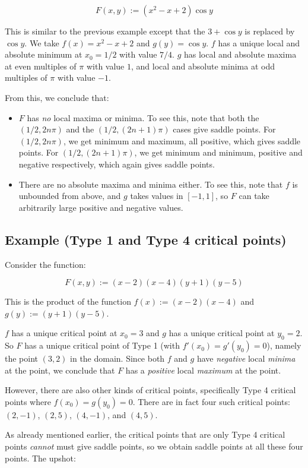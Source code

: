 \documentclass[10pt]{amsart}
\begin{document}
$$F(x,y) := (x^2 - x + 2)\cos y$$

This is similar to the previous example except that the $3 + \cos y$
is replaced by $\cos y$. We take $f(x) = x^2 - x + 2$ and $g(y) = \cos
y$. $f$ has a unique local and absolute minimum at $x_0 = 1/2$ with
value $7/4$. $g$ has local and absolute maxima at even multiples of
$\pi$ with value $1$, and local and absolute minima at odd multiples
of $\pi$ with value $-1$.

From this, we conclude that:

\begin{itemize}
\item $F$ has {\em no} local maxima or minima. To see this, note that
  both the $(1/2,2n\pi)$ and the $(1/2,(2n + 1)\pi)$ cases give saddle
  points. For $(1/2,2n\pi)$, we get minimum and maximum, all positive,
  which gives saddle points. For $(1/2,(2n+1)\pi)$, we get minimum and
  minimum, positive and negative respectively, which again gives
  saddle points.
\item There are no absolute maxima and minima either. To see this,
  note that $f$ is unbounded from above, and $g$ takes values in
  $[-1,1]$, so $F$ can take arbitrarily large positive and negative
  values.
\end{itemize}

\subsection{Example (Type 1 and Type 4 critical points)}

Consider the function:

$$F(x,y) := (x-2)(x-4)(y+1)(y - 5)$$

This is the product of the function $f(x) := (x-2)(x-4)$ and $g(y) :=
(y+1)(y-5)$.

$f$ has a unique critical point at $x_0 = 3$ and $g$ has a unique
critical point at $y_0 = 2$. So $F$ has a unique critical point of
Type 1 (with $f'(x_0) = g'(y_0) = 0$), namely the point $(3,2)$ in the
domain. Since both $f$ and $g$ have {\em negative} local {\em minima}
at the point, we conclude that $F$ has a {\em positive} local {\em
maximum} at the point.

However, there are also other kinds of critical points, specifically
Type 4 critical points where $f(x_0) = g(y_0) = 0$. There are in fact
four such critical points: $(2,-1)$, $(2,5)$, $(4,-1)$, and $(4,5)$.

As already mentioned earlier, the critical points that are only Type 4
critical points {\em cannot} must give saddle points, so we obtain
saddle points at all these four points. The upshot:
\end{document}
